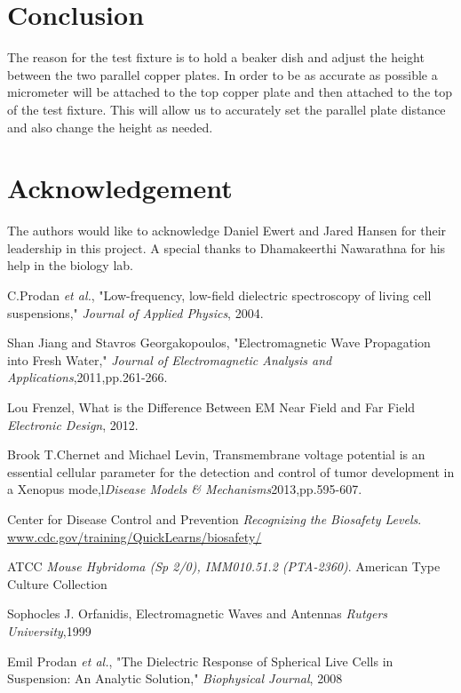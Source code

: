 \documentclass[journal]{IEEEtran}
\begin{document}
\section{Conclusion}
The reason for the test fixture is to hold a beaker dish and
  adjust the height between the two parallel copper plates. In order to be as accurate as possible a micrometer will be attached to the top copper plate and then attached to the top of the test fixture. This will allow us to accurately set the parallel plate distance and also change the height as needed. 

\section{Acknowledgement}
The authors would like to acknowledge Daniel Ewert and Jared Hansen for their leadership in this project. A special thanks to Dhamakeerthi Nawarathna for his help in the biology lab.

\begin{thebibliography}{9}

C.Prodan \textit{et al.},
"Low-frequency, low-field dielectric spectroscopy of living cell suspensions,"
\textit{Journal of Applied Physics}, 2004.

Shan Jiang and Stavros Georgakopoulos,
"Electromagnetic Wave Propagation into Fresh Water,"
\textit{Journal of Electromagnetic Analysis and Applications},2011,pp.261-266.

Lou Frenzel,
What is the Difference Between EM Near Field and Far Field
\textit{Electronic Design}, 2012.

Brook T.Chernet and Michael Levin,
Transmembrane voltage potential is an essential cellular parameter for the detection and control of tumor development in a Xenopus mode,l\textit{Disease Models \& Mechanisms}2013,pp.595-607.

Center for Disease Control and Prevention
\textit{Recognizing the Biosafety Levels}.
\url{www.cdc.gov/training/QuickLearns/biosafety/}

ATCC
\textit{Mouse Hybridoma (Sp 2/0), IMM010.51.2 (PTA-2360)}.
American Type Culture Collection

Sophocles J. Orfanidis,
Electromagnetic Waves and Antennas
\textit{Rutgers University},1999

Emil Prodan \textit{et al.},
"The Dielectric Response of Spherical Live Cells in Suspension: An Analytic Solution," \textit{Biophysical Journal}, 2008

\end{thebibliography}
\end{document}
